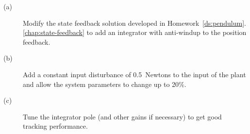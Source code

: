 
\begin{description}
\item[(a)] Modify the state feedback solution developed in Homework~\ref{ds:pendulum}.\ref{chap:state-feedback} to add an integrator with anti-windup to the position feedback.
\item[(b)] Add a constant input disturbance of 0.5~Newtons to the input of the plant and allow the system parameters to change up to 20\%.
\item[(c)] Tune the integrator pole (and other gains if necessary) to get good tracking performance.
\end{description}
